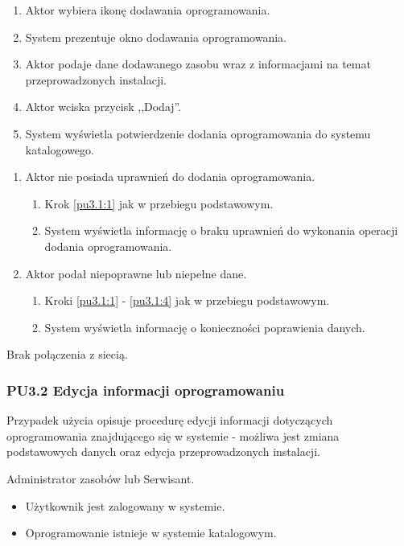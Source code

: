 \begin{enumerate}
\item \label{pu3.1:1} Aktor wybiera ikonę dodawania oprogramowania.
\item System prezentuje okno dodawania oprogramowania.
\item Aktor podaje dane dodawanego zasobu wraz z informacjami na temat przeprowadzonych instalacji.
\item \label{pu3.1:4} Aktor wciska przycisk ,,Dodaj''.
\item System wyświetla potwierdzenie dodania oprogramowania do systemu katalogowego.
\end{enumerate}

\begin{enumerate}
\item Aktor nie posiada uprawnień do dodania oprogramowania.
	\begin{enumerate}[label*=\arabic*.]
		\item Krok \ref{pu3.1:1} jak w przebiegu podstawowym.
		\item System wyświetla informację o braku uprawnień do wykonania operacji dodania oprogramowania.
	\end{enumerate}
\item Aktor podał niepoprawne lub niepełne dane.
	\begin{enumerate}[label*=\arabic*.]
		\item Kroki \ref{pu3.1:1} - \ref{pu3.1:4} jak w przebiegu podstawowym.
		\item System wyświetla informację o konieczności poprawienia danych.
	\end{enumerate}
\end{enumerate}

Brak połączenia z siecią.

\subsubsection{PU3.2 Edycja informacji oprogramowaniu}

Przypadek użycia opisuje procedurę edycji informacji dotyczących oprogramowania znajdującego się w systemie - możliwa jest zmiana podstawowych danych oraz edycja przeprowadzonych instalacji.

Administrator zasobów lub Serwisant.

\begin{itemize}
\item Użytkownik jest zalogowany w systemie.
\item Oprogramowanie istnieje w systemie katalogowym.
\end{itemize}

